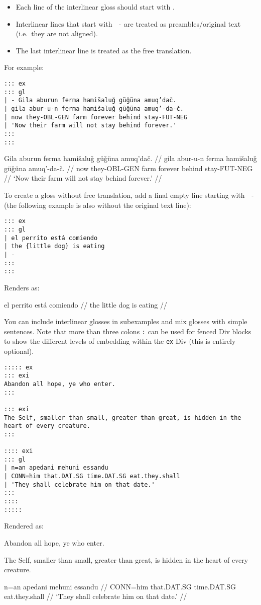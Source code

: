 \documentclass[
  letterpaper,
  DIV=11,
  numbers=noendperiod]{scrartcl}
\providecommand{\tightlist}{%
  \setlength{\itemsep}{0pt}\setlength{\parskip}{0pt}}\usepackage{longtable,booktabs,array}
\let\expexgla\gla
\let\gla\expexgla
\begin{document}
\begin{itemize}
\tightlist
\item
  Each line of the interlinear gloss should start with
  \texttt{\textbar{}}.
\item
  Interlinear lines that start with \texttt{\textbar{}\ -} are treated
  as preambles/original text (i.e.~they are not aligned).
\item
  The last interlinear line is treated as the free translation.
\end{itemize}

For example:

\begin{verbatim}
::: ex
::: gl
| - Gila aburun ferma hamišaluǧ güǧüna amuq’dač.
| gila abur-u-n ferma hamišaluǧ güǧüna amuq’-da-č.
| now they-OBL-GEN farm forever behind stay-FUT-NEG
| 'Now their farm will not stay behind forever.'
:::
:::
\end{verbatim}

\label{ex-lez}
\pex
\begingl
\glpreamble  Gila aburun ferma hamišaluǧ güǧüna amuq’dač. //
\gla gila abur-u-n ferma hamišaluǧ güǧüna amuq’-da-č. //
\glb now they-OBL-GEN farm forever behind stay-FUT-NEG //
\glft ‘Now their farm will not stay behind forever.’ //
\endgl
\xe

To create a gloss without free translation, add a final empty line
starting with \texttt{\textbar{}\ -} (the following example is also
without the original text line):

\begin{verbatim}
::: ex
::: gl
| el perrito está comiendo
| the {little dog} is eating
| -
:::
:::
\end{verbatim}

Renders as:

\label{ex-sp}
\pex
\begingl
\gla el perrito está comiendo //
\glb the {little dog} is eating //
\endgl
\xe

You can include interlinear glosses in subexamples and mix glosses with
simple sentences. Note that more than three colons \texttt{:} can be
used for fenced Div blocks to show the different levels of embedding
within the \texttt{ex} Div (this is entirely optional).

\begin{verbatim}
::::: ex
::: exi
Abandon all hope, ye who enter.
:::

::: exi
The Self, smaller than small, greater than great, is hidden in the heart of every creature.
:::

:::: exi
::: gl
| n=an apedani mehuni essandu
| CONN=him that.DAT.SG time.DAT.SG eat.they.shall
| 'They shall celebrate him on that date.'
:::
::::
:::::
\end{verbatim}

Rendered as:

\pex
\a Abandon all hope, ye who enter.

\a The Self, smaller than small, greater than great, is hidden in the
heart of every creature.

\a \begingl
\gla n=an apedani mehuni essandu //
\glb CONN=him that.DAT.SG time.DAT.SG eat.they.shall //
\glft ‘They shall celebrate him on that date.’ //
\endgl

\xe
\end{document}
